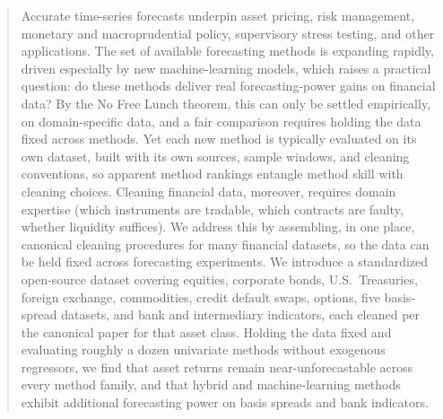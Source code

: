 \documentclass{article}
\begin{document}
\begin{abstract}
    Accurate time-series forecasts underpin asset pricing, risk management, monetary and macroprudential policy, supervisory stress testing, and other applications. The set of available forecasting methods is expanding rapidly, driven especially by new machine-learning models, which raises a practical question: do these methods deliver real forecasting-power gains on financial data? By the No Free Lunch theorem, this can only be settled empirically, on domain-specific data, and a fair comparison requires holding the data fixed across methods. Yet each new method is typically evaluated on its own dataset, built with its own sources, sample windows, and cleaning conventions, so apparent method rankings entangle method skill with cleaning choices. Cleaning financial data, moreover, requires domain expertise (which instruments are tradable, which contracts are faulty, whether liquidity suffices). We address this by assembling, in one place, canonical cleaning procedures for many financial datasets, so the data can be held fixed across forecasting experiments.
    We introduce a standardized open-source dataset covering equities, corporate bonds, U.S.~Treasuries, foreign exchange, commodities, credit default swaps, options, five basis-spread datasets, and bank and intermediary indicators, each cleaned per the canonical paper for that asset class.
    Holding the data fixed and evaluating roughly a dozen univariate methods without exogenous regressors, we find that asset returns remain near-unforecastable across every method family, and that hybrid and machine-learning methods exhibit additional forecasting power on basis spreads and bank indicators. 
    \end{abstract}
\end{document}
